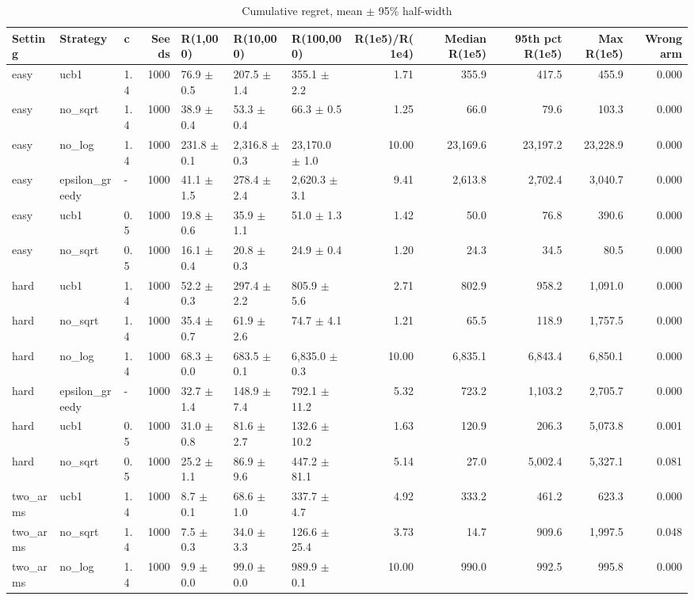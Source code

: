 \begin{table}[!t]
\centering
\caption{Cumulative regret, mean $\pm$ 95\% half-width}
\label{tab:bandit_regret}
\small
\begin{tabular}{lllrlllrrrrr}
\toprule
Setting & Strategy & c & Seeds & R(1,000) & R(10,000) & R(100,000) & R(1e5)/R(1e4) & Median R(1e5) & 95th pct R(1e5) & Max R(1e5) & Wrong arm \\
\midrule
easy & ucb1 & 1.4 & 1000 & 76.9 $\pm$ 0.5 & 207.5 $\pm$ 1.4 & 355.1 $\pm$ 2.2 & 1.71 & 355.9 & 417.5 & 455.9 & 0.000 \\
easy & no\_sqrt & 1.4 & 1000 & 38.9 $\pm$ 0.4 & 53.3 $\pm$ 0.4 & 66.3 $\pm$ 0.5 & 1.25 & 66.0 & 79.6 & 103.3 & 0.000 \\
easy & no\_log & 1.4 & 1000 & 231.8 $\pm$ 0.1 & 2,316.8 $\pm$ 0.3 & 23,170.0 $\pm$ 1.0 & 10.00 & 23,169.6 & 23,197.2 & 23,228.9 & 0.000 \\
easy & epsilon\_greedy & - & 1000 & 41.1 $\pm$ 1.5 & 278.4 $\pm$ 2.4 & 2,620.3 $\pm$ 3.1 & 9.41 & 2,613.8 & 2,702.4 & 3,040.7 & 0.000 \\
easy & ucb1 & 0.5 & 1000 & 19.8 $\pm$ 0.6 & 35.9 $\pm$ 1.1 & 51.0 $\pm$ 1.3 & 1.42 & 50.0 & 76.8 & 390.6 & 0.000 \\
easy & no\_sqrt & 0.5 & 1000 & 16.1 $\pm$ 0.4 & 20.8 $\pm$ 0.3 & 24.9 $\pm$ 0.4 & 1.20 & 24.3 & 34.5 & 80.5 & 0.000 \\
hard & ucb1 & 1.4 & 1000 & 52.2 $\pm$ 0.3 & 297.4 $\pm$ 2.2 & 805.9 $\pm$ 5.6 & 2.71 & 802.9 & 958.2 & 1,091.0 & 0.000 \\
hard & no\_sqrt & 1.4 & 1000 & 35.4 $\pm$ 0.7 & 61.9 $\pm$ 2.6 & 74.7 $\pm$ 4.1 & 1.21 & 65.5 & 118.9 & 1,757.5 & 0.000 \\
hard & no\_log & 1.4 & 1000 & 68.3 $\pm$ 0.0 & 683.5 $\pm$ 0.1 & 6,835.0 $\pm$ 0.3 & 10.00 & 6,835.1 & 6,843.4 & 6,850.1 & 0.000 \\
hard & epsilon\_greedy & - & 1000 & 32.7 $\pm$ 1.4 & 148.9 $\pm$ 7.4 & 792.1 $\pm$ 11.2 & 5.32 & 723.2 & 1,103.2 & 2,705.7 & 0.000 \\
hard & ucb1 & 0.5 & 1000 & 31.0 $\pm$ 0.8 & 81.6 $\pm$ 2.7 & 132.6 $\pm$ 10.2 & 1.63 & 120.9 & 206.3 & 5,073.8 & 0.001 \\
hard & no\_sqrt & 0.5 & 1000 & 25.2 $\pm$ 1.1 & 86.9 $\pm$ 9.6 & 447.2 $\pm$ 81.1 & 5.14 & 27.0 & 5,002.4 & 5,327.1 & 0.081 \\
two\_arms & ucb1 & 1.4 & 1000 & 8.7 $\pm$ 0.1 & 68.6 $\pm$ 1.0 & 337.7 $\pm$ 4.7 & 4.92 & 333.2 & 461.2 & 623.3 & 0.000 \\
two\_arms & no\_sqrt & 1.4 & 1000 & 7.5 $\pm$ 0.3 & 34.0 $\pm$ 3.3 & 126.6 $\pm$ 25.4 & 3.73 & 14.7 & 909.6 & 1,997.5 & 0.048 \\
two\_arms & no\_log & 1.4 & 1000 & 9.9 $\pm$ 0.0 & 99.0 $\pm$ 0.0 & 989.9 $\pm$ 0.1 & 10.00 & 990.0 & 992.5 & 995.8 & 0.000 \\
\bottomrule
\end{tabular}
\end{table}
